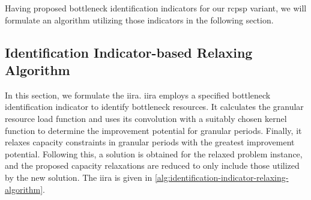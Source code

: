 Having proposed bottleneck identification indicators for our \ac{rcpsp} variant,
we will formulate an algorithm utilizing those indicators in the following section.

\subsection{Identification Indicator-based Relaxing Algorithm} \label{subsec:solution-approach/baseline-solution/iira}

In this section, we formulate the \acf{iira}.
\ac{iira} employs a specified bottleneck identification indicator to identify bottleneck resources.
It calculates the granular resource load function
and uses its convolution with a suitably chosen kernel function
to determine the improvement potential for granular periods.
Finally, it relaxes capacity constraints in granular periods with the greatest improvement potential.
Following this, a solution is obtained for the relaxed problem instance,
and the proposed capacity relaxations are reduced to only include those utilized by the new solution.
The \acf{iira} is given in \cref{alg:identification-indicator-relaxing-algorithm}.


